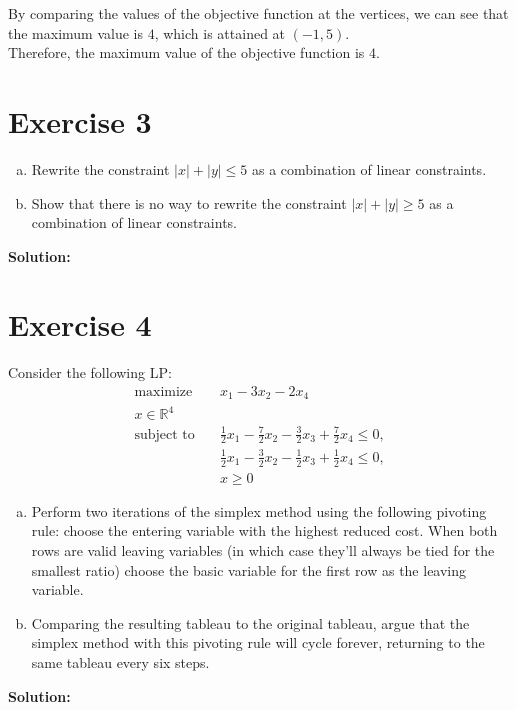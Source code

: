 \documentclass{article}
\begin{document}
By comparing the values of the objective function at the vertices, we can see that the maximum value is $4$, which is attained at $(-1, 5)$. \\

Therefore, the maximum value of the objective function is $4$.

\newpage

\section*{Exercise 3}
\begin{enumerate}[(a)]
\item Rewrite the constraint $|x| + |y| \leq 5$ as a combination of linear constraints.
\item Show that there is no way to rewrite the constraint $|x| + |y| \geq 5$ as a combination of linear constraints.
\end{enumerate}

\textbf{Solution: }
\newpage

\section*{Exercise 4}
Consider the following LP:
\begin{align*}
\text{maximize} \quad & x_1 - 3x_2 - 2x_4 \\
x \in \mathbb{R}^4 \\
\text{subject to} \quad & \frac{1}{2}x_1 - \frac{7}{2}x_2 - \frac{3}{2}x_3 + \frac{7}{2}x_4 \leq 0, \\
& \frac{1}{2}x_1 - \frac{3}{2}x_2 - \frac{1}{2}x_3 + \frac{1}{2}x_4 \leq 0, \\
& x \geq 0
\end{align*}

\begin{enumerate}[(a)]
\item Perform two iterations of the simplex method using the following pivoting rule: choose the entering variable with the highest reduced cost. When both rows are valid leaving variables (in which case they'll always be tied for the smallest ratio) choose the basic variable for the first row as the leaving variable.
\item Comparing the resulting tableau to the original tableau, argue that the simplex method with this pivoting rule will cycle forever, returning to the same tableau every six steps.
\end{enumerate}

\textbf{Solution: }
\newpage
\end{document}
